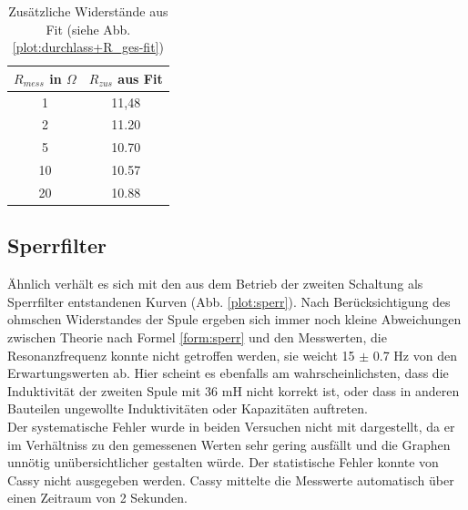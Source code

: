 \begin{table}
\centering
\begin{tabular}{cc}
$R_{mess}$ in $\Omega$ & $R_{zus}$ aus Fit \\
\toprule 
1 & 11,48 \\ 
2 & 11.20 \\ 
5 & 10.70 \\ 
10 & 10.57 \\  
20 & 10.88 \\
\end{tabular}
\caption{Zusätzliche Widerstände aus Fit (siehe Abb. \ref{plot:durchlass+R_ges-fit})} 
\end{table}

\subsection{Sperrfilter}
Ähnlich verhält es sich mit den aus dem Betrieb der zweiten Schaltung als Sperrfilter entstandenen Kurven (Abb. \ref{plot:sperr}). Nach Berücksichtigung des ohmschen Widerstandes der Spule ergeben sich immer noch kleine Abweichungen zwischen Theorie nach Formel \eqref{form:sperr} und den Messwerten, die Resonanzfrequenz konnte nicht getroffen werden, sie weicht 15 $\pm$ 0.7 Hz von den Erwartungswerten ab. Hier scheint es ebenfalls am wahrscheinlichsten, dass die Induktivität der zweiten Spule mit 36 mH nicht korrekt ist, oder dass in anderen Bauteilen ungewollte Induktivitäten oder Kapazitäten auftreten.
\\
Der systematische Fehler wurde in beiden Versuchen nicht mit dargestellt, da er im Verhältniss zu den gemessenen Werten sehr gering ausfällt und die Graphen unnötig unübersichtlicher gestalten würde.
Der statistische Fehler konnte von Cassy nicht ausgegeben werden. Cassy mittelte die Messwerte automatisch über einen Zeitraum von 2 Sekunden.


